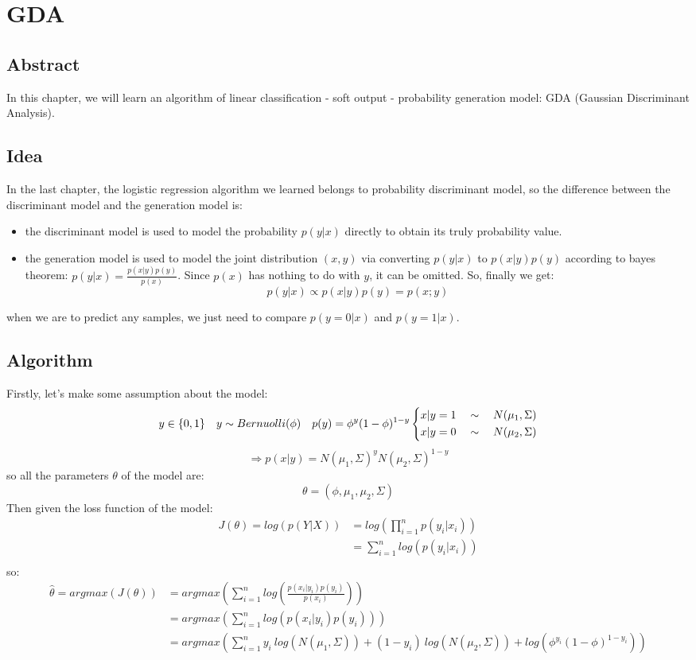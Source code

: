 \documentclass{report}
\begin{document}
\section{GDA}
\subsection{Abstract}
In this chapter, we will learn an algorithm of linear classification - soft output - probability generation model: GDA (Gaussian Discriminant Analysis).
\subsection{Idea}
In the last chapter, the logistic regression algorithm we learned belongs to probability discriminant model, so the difference between the discriminant model and the generation model is:
\begin{itemize}
	\item the discriminant model is used to model the probability $p(y|x)$ directly to obtain its truly probability value.
	\item the generation model is used to model the joint distribution $(x,y)$ via converting $p(y|x)$ to $p(x|y)p(y)$ according to bayes theorem: $p(y|x)=\frac{p(x|y)p(y)}{p(x)}$. Since $p(x)$ has nothing to do with $y$, it can be omitted. So, finally we get:$$
p(y|x)\propto p(x|y)p(y)=p(x;y)
$$
\end{itemize}
when we are to predict any samples, we just need to compare $p(y=0|x)$ and $p(y=1|x)$.
\subsection{Algorithm}
Firstly, let's make some assumption about the model:
$$
y\in \{0,1\}\quad y\sim Bernuolli(\phi)\quad p(y)=\phi^y(1-\phi)^{1-y}\\\left \{\begin{aligned}x|y=1 \quad \sim \quad N(\mu_1,\Sigma)\\x|y=0 \quad \sim \quad N(\mu_2,\Sigma)\end{aligned}\right.
$$
$$
\Longrightarrow p(x|y)=N(\mu_1,\Sigma)^yN(\mu_2,\Sigma)^{1-y}
$$
so all the parameters $\theta$ of the model are:
$$
\theta=(\phi, \mu_1, \mu_2, \Sigma)
$$
Then given the loss function of the model:
$$
\begin{aligned}
J(\theta)=log(p(Y|X))&=log(\prod_{i=1}^n p(y_i|x_i))\\
&=\sum_{i=1}^n log(p(y_i|x_i))\\
\end{aligned}
$$
so:
$$
\begin{aligned}
\hat{\theta}=argmax(J(\theta))&=argmax(\sum_{i=1}^nlog(\frac{p(x_i|y_i)p(y_i)}{p(x_i)}))\\
&=argmax(\sum_{i=1}^n log(p(x_i|y_i)p(y_i)))\\
&=argmax(\sum_{i=1}^n y_i\ log(N(\mu_1,\Sigma))+(1-y_i)\ log(N(\mu_2,\Sigma))+log(\phi^{y_i} (1-\phi)^{1-y_i}))
\end{aligned}
$$
\end{document}

